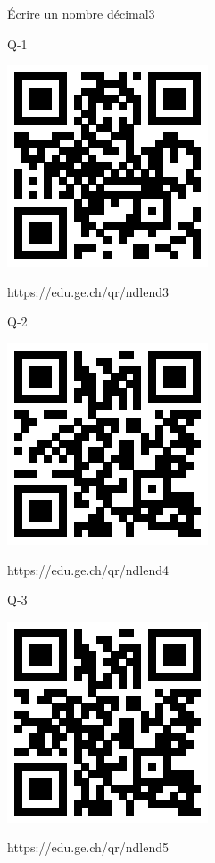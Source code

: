 \documentclass[a4paper,11pt]{report}
\begin{document}
	\begin{qmoodle}{Écrire un nombre décimal}{3}{
	\begin{center}	
		Q-1

\includegraphics[scale=1]{media/qr/ndlend3}

\tiny{{https://edu.ge.ch/qr/ndlend3}}
\end{center}
	\begin{center}	
		Q-2

\includegraphics[scale=1]{media/qr/ndlend4}

\tiny{{https://edu.ge.ch/qr/ndlend4}}
\end{center}
	\begin{center}	
		Q-3

\includegraphics[scale=1]{media/qr/ndlend5}

\tiny{{https://edu.ge.ch/qr/ndlend5}}
\end{center}
}
\end{qmoodle}
\end{document}
